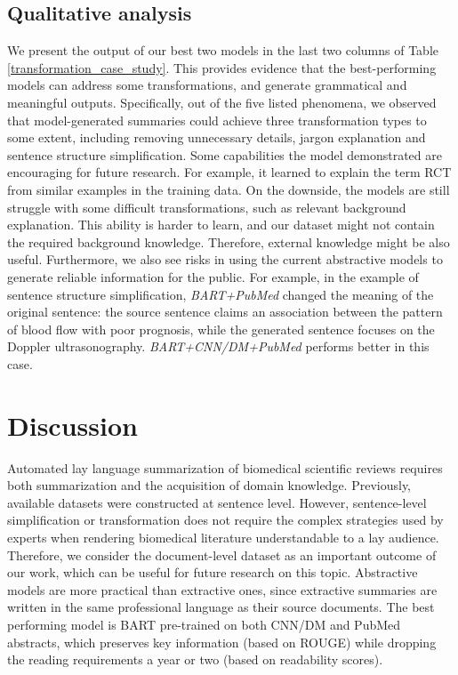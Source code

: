\documentclass[letterpaper, table]{article} %
\begin{document}
\subsection{Qualitative analysis}
We present the output of our best two models in the last two columns of Table \ref{transformation_case_study}.
This provides evidence that the best-performing models can address some transformations, and generate grammatical and meaningful outputs.
Specifically, out of the five listed phenomena, we observed that model-generated summaries could achieve three transformation types to some extent, including removing unnecessary details, jargon explanation and sentence structure simplification.
Some capabilities the model demonstrated are encouraging for future research.
For example, it learned to explain the term RCT from similar examples in the training data.  On the downside, the  models are still struggle with some difficult transformations, such as relevant background explanation. This ability is harder to learn, and our dataset might not contain the required background knowledge.
Therefore, external knowledge might be also useful.
Furthermore, we also see risks in using the current abstractive models to generate reliable information for the public. For example, in the example of sentence structure simplification, \textit{BART+PubMed} changed the meaning of the original sentence: the source sentence claims an association between the pattern of blood flow with poor prognosis, while the generated sentence focuses on the Doppler ultrasonography. \textit{BART+CNN/DM+PubMed}
performs better in this case.












\vspace{-1.06mm}
\vspace{-1.44mm}
\section{Discussion}
Automated lay language summarization of biomedical scientific reviews requires both summarization and the acquisition of domain knowledge.
Previously, available datasets
were constructed at sentence level. However, sentence-level simplification or transformation does not require the complex strategies used by experts when rendering biomedical literature understandable to a lay audience. Therefore, we consider the
document-level dataset as an important outcome of our work,  which
can be useful for future research on this topic.
Abstractive models are more practical than extractive ones,
since extractive summaries
are written
in the same professional language as their source documents.
The best performing model is BART pre-trained on both CNN/DM and PubMed abstracts, which preserves key information (based on ROUGE) while dropping the reading requirements a year or two (based on readability scores).
\end{document}
